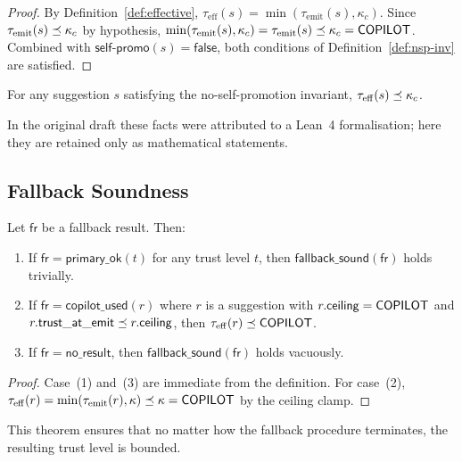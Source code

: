 \documentclass[11pt]{article}
\newcommand{\selfpromo}{\mathsf{self\text{-}promo}}
\begin{document}
\begin{proof}
By Definition~\ref{def:effective},
$\tau_{\mathrm{eff}}(s) = \min(\tau_{\mathrm{emit}}(s), \kappa_c)$.
Since $\tau_{\mathrm{emit}}(s) \preceq \kappa_c$ by hypothesis,
$\min(\tau_{\mathrm{emit}}(s), \kappa_c) = \tau_{\mathrm{emit}}(s)
  \preceq \kappa_c = \mathsf{COPILOT}$.
Combined with $\selfpromo(s) = \mathsf{false}$, both conditions of
Definition~\ref{def:nsp-inv} are satisfied.
\end{proof}

\begin{corollary}\label{cor:nsp-effective}
For any suggestion $s$ satisfying the no-self-promotion invariant,
$\tau_{\mathrm{eff}}(s) \preceq \kappa_c$.
\end{corollary}

In the original draft these facts were attributed to a Lean~4
formalisation; here they are retained only as mathematical statements.

\subsection{Fallback Soundness}\label{sec:thm-fallback}

\begin{theorem}\label{thm:fallback}
Let $\mathsf{fr}$ be a fallback result.  Then:
\begin{enumerate}
  \item If $\mathsf{fr} = \mathsf{primary\_ok}(t)$ for any trust
    level $t$, then $\mathsf{fallback\_sound}(\mathsf{fr})$ holds
    trivially.
  \item If $\mathsf{fr} = \mathsf{copilot\_used}(r)$ where $r$ is
    a suggestion with $r.\mathsf{ceiling} = \mathsf{COPILOT}$ and
    $r.\mathsf{trust\_at\_emit} \preceq r.\mathsf{ceiling}$, then
    $\tau_{\mathrm{eff}}(r) \preceq \mathsf{COPILOT}$.
  \item If $\mathsf{fr} = \mathsf{no\_result}$, then
    $\mathsf{fallback\_sound}(\mathsf{fr})$ holds vacuously.
\end{enumerate}
\end{theorem}

\begin{proof}
Case~(1) and~(3) are immediate from the definition.  For case~(2),
$\tau_{\mathrm{eff}}(r) = \min(\tau_{\mathrm{emit}}(r), \kappa)
  \preceq \kappa = \mathsf{COPILOT}$ by the ceiling clamp.
\end{proof}

This theorem ensures that no matter how the fallback procedure
terminates, the resulting trust level is bounded.
\end{document}
